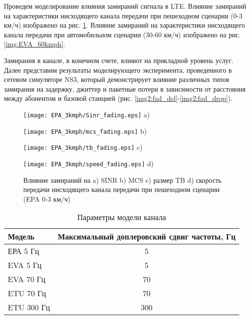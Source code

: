 Проведем моделирование влияния замираний сигнала в LTE. Влияние замираний на характеристики нисходящего канала передачи при пешеходном сценарии (0-3 км/ч) изображено на рис. \ref{img:EPA_3kmph}. Влияние замираний на характеристики нисходящего канала передачи при автомобильном сценарии (30-60 км/ч) изображено на рис. \ref{img:EVA_60kmph}.

Замирания в канале, в конечном счете, влияют на прикладной уровень услуг. Далее представим результаты моделирующего эксперимента, проведенного в сетевом симуляторе NS3, который демонстрирует влияние различных типов замирания на задержку, джиттер и пакетные потери в зависимости от расстояния между абонентом и базовой станцией (рис. \ref{img2:fad_del}-\ref{img2:fad_drop}).

\begin{figure} [!h]
\begin{minipage}[h]{0.47\linewidth}
\center
\texttt{[image: EPA\_3kmph/Sinr\_fading.eps]} a) \\
\end{minipage}
\hfill
\begin{minipage}[h]{0.47\linewidth}
\center
\texttt{[image: EPA\_3kmph/mcs\_fading.eps]} b) \\
\end{minipage}
\vfill
\begin{minipage}[h]{0.47\linewidth}
\center
\texttt{[image: EPA\_3kmph/tb\_fading.eps]} c) \\
\end{minipage}
\hfill
\begin{minipage}[h]{0.47\linewidth}
\center
\texttt{[image: EPA\_3kmph/speed\_fading.eps]} d) \\
\end{minipage}
\caption{Влияние замираний на a) SINR b) MCS c) размер TB d) скорость передачи нисходящего канала передачи при пешеходном сценарии (EPA 0-3 км/ч)}
\label{img:EPA_3kmph}
\end{figure}


\begin{table} [!htb]
  \centering
\parbox{15cm}{\caption{Параметры модели канала \cite{iks}}\label{model_chanel}}
\begin{tabular}{|l|c|}
    \hline
    \hline
    Модель     & Максимальный доплеровский сдвиг частоты, Гц \\ \hline \hline
    ЕРА 5 Гц   & 5                                       \\ \hline
    EVA 5 Гц   & 5                                       \\ \hline
    EVA 70 Гц  & 70                                      \\ \hline
    ETU 70 Гц  & 70                                      \\ \hline
    ETU 300 Гц & 300                                     \\ \hline
    \end{tabular}
\end{table}

